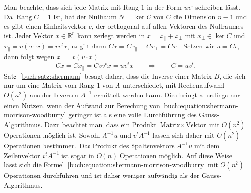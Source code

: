 Man beachte, dass sich jede Matrix mit Rang $1$ in der Form $uv^t$
schreiben lässt.
Da $\operatorname{Rang}C=1$ ist, hat der Nullraum $N=\operatorname{ker}C$
von $C$ die Dimension $n-1$ und es gibt einen Einheitsvektor $v$,
der orthogonal auf allen Vektoren des Nullraumes ist.
Jeder Vektor $x\in \mathbb R^n$ kann zerlegt werden in
$x=x_{\|} + x_{\perp}$ mit $x_{\perp}\in\operatorname{ker}C$ und
$x_{\|}=v(v\cdot x)=v v^tx$, es gilt dann
$Cx = Cx_{\|} + Cx_{\perp} = Cx_{\|}$.
Setzen wir $u=Cv$, dann folgt wegen $x_{\|} = v(v\cdot x)$ 
\[
Cx = Cx_{\|} = Cv v^t x = uv^t x
\qquad\Rightarrow\qquad
C = uv^t.
\]
Satz~\ref{buch:satz:shermann} besagt daher, dass die Inverse einer
Matrix $B$, die sich nur um eine Matrix vom Rang $1$ von $A$ unterschiedet,
mit Rechenaufwand $O(n^2)$ aus der Inversen $A^{-1}$ ermittelt werden kann.
Dies bringt allerdings nur einen Nutzen, wenn der Aufwand zur Berechung
von \eqref{buch:equation:shermann-morrison-woodburry} geringer ist als
eine volle Durchführung des Gauss-Algorithmus.
Dazu beachtet man, dass ein Produkt $\text{Matrix}\times\text{Vektor}$ 
mit $O(n^2)$ Operationen möglich ist.
Sowohl $A^{-1}u$ und $v^tA^{-1}$ lassen sich daher mit $O(n^2)$
Operationen bestimmen.
Das Produkt des Spaltenvektors $A^{-1}u$ mit dem Zeilenvektor $v^tA^{-1}$
ist sogar in $O(n)$ Operationen möglich.
Auf diese Weise lässt sich
die Formel~\ref{buch:equation:shermann-morrison-woodburry} mit
$O(n^2)$ Operationen durchführen und ist daher weniger aufwändig als
der Gauss-Algorithmus.
 
